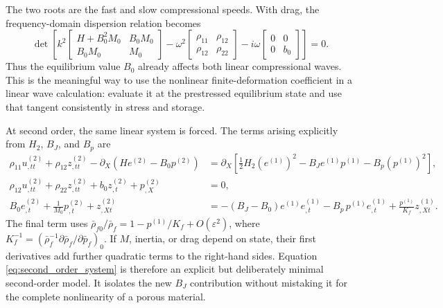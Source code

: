 \documentclass[11pt]{article}
\begin{document}
The two roots are the fast and slow compressional speeds.  With drag, the
frequency-domain dispersion relation becomes
\begin{equation}
    \det\left[
    k^2
    \begin{bmatrix}
        H+B_0^2M_0&B_0M_0\\
        B_0M_0&M_0
    \end{bmatrix}
    -\omega^2
    \begin{bmatrix}
        \rho_{11}&\rho_{12}\\
        \rho_{12}&\rho_{22}
    \end{bmatrix}
    -i\omega
    \begin{bmatrix}
        0&0\\
        0&b_0
    \end{bmatrix}
    \right]=0.
    \label{eq:damped_dispersion}
\end{equation}
Thus the equilibrium value \(B_0\) already affects both linear compressional
waves.  This is the meaningful way to use the nonlinear finite-deformation
coefficient in a linear wave calculation: evaluate it at the prestressed
equilibrium state and use that tangent consistently in stress and storage.

At second order, the same linear system is forced.  The terms arising
explicitly from \(H_2\), \(B_J\), and \(B_p\) are
\begin{subequations}
\label{eq:second_order_system}
\begin{align}
    \rho_{11}u^{(2)}_{,tt}+\rho_{12}z^{(2)}_{,tt}
    -\partial_X\left(H e^{(2)}-B_0p^{(2)}\right)
    & =\partial_X
    \left[
        \frac{1}{2}H_2\left(e^{(1)}\right)^2
        -B_J e^{(1)}p^{(1)}
        -B_p\left(p^{(1)}\right)^2
    \right],
    \label{eq:second_order_total_momentum}\\
    \rho_{12}u^{(2)}_{,tt}+\rho_{22}z^{(2)}_{,tt}
    +b_0z^{(2)}_{,t}+p^{(2)}_{,X}
    & =0,
    \label{eq:second_order_relative_momentum}\\
    B_0e^{(2)}_{,t}+\frac{1}{M_0}p^{(2)}_{,t}
    +z^{(2)}_{,Xt}
    & =-\left(B_J-B_0\right)e^{(1)}e^{(1)}_{,t}
    -B_p\,p^{(1)}e^{(1)}_{,t}
    +\frac{p^{(1)}}{K_f}z^{(1)}_{,Xt}.
    \label{eq:second_order_storage}
\end{align}
\end{subequations}
The final term uses
\(\bar\rho_{f0}/\bar\rho_f=1-p^{(1)}/K_f+O(\varepsilon^2)\), where
\(K_f^{-1}=(\bar\rho_f^{-1}\partial\bar\rho_f/\partial\bar p_f)_0\).
If \(M\), inertia, or drag depend on state, their first derivatives add further
quadratic terms to the right-hand sides.  Equation
\eqref{eq:second_order_system} is therefore an explicit but deliberately
minimal second-order model.  It isolates the new \(B_J\) contribution without
mistaking it for the complete nonlinearity of a porous material.
\end{document}
